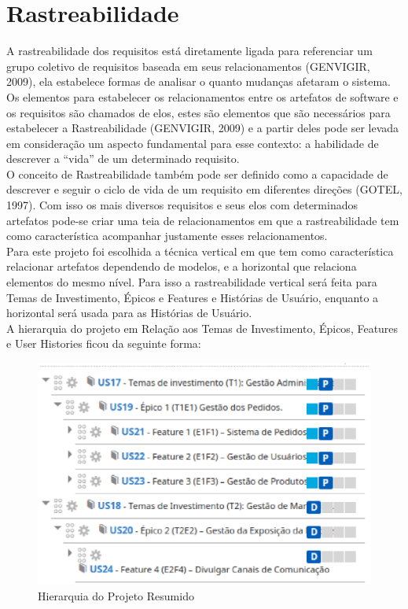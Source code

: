 \section{Rastreabilidade}

A rastreabilidade dos requisitos está diretamente ligada para referenciar um grupo coletivo de requisitos baseada em seus relacionamentos (GENVIGIR, 2009), ela estabelece formas de analisar o quanto mudanças afetaram o sistema.
\tab Os elementos para estabelecer os relacionamentos entre os artefatos de software e os requisitos são chamados de elos, estes são elementos que são necessários para estabelecer a Rastreabilidade (GENVIGIR, 2009) e a partir deles pode ser levada em consideração um aspecto fundamental para esse contexto: a habilidade de descrever a “vida” de um determinado requisito. \\
\tab O conceito de Rastreabilidade também pode ser definido como a capacidade de descrever e seguir o ciclo de vida de um requisito em diferentes direções (GOTEL, 1997). Com isso os mais diversos requisitos e seus elos com determinados artefatos pode-se criar uma teia de relacionamentos em que a rastreabilidade tem como característica acompanhar justamente esses relacionamentos.\\
\tab Para este projeto foi escolhida a técnica vertical em que tem como característica relacionar artefatos dependendo de modelos, e a horizontal que relaciona elementos do mesmo nível. Para isso a rastreabilidade vertical será feita para Temas de Investimento, Épicos e Features e Histórias de Usuário, enquanto a horizontal será usada para as Histórias de Usuário.\\
\tab A hierarquia do projeto em Relação aos Temas de Investimento, Épicos, Features e User Histories ficou da seguinte forma:\\

\begin{figure}[h]
    \centering
    \label{fig01}
        \includegraphics[keepaspectratio=true,scale=0.5]{figuras/RallyDev/hierarquia1.eps}
    \caption{Hierarquia do Projeto Resumido}
\end{figure}

